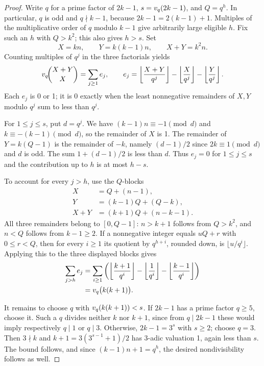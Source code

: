 \documentclass[11pt,a4paper]{article}
\begin{document}
\begin{proof}
Write $q$ for a prime factor of $2k-1$, $s=v_q(2k-1)$, and
$Q=q^h$. In particular, $q$ is odd and $q\nmid k-1$, because
$2k-1=2(k-1)+1$. Multiples of the multiplicative order of $q$ modulo
$k-1$ give arbitrarily large eligible $h$. Fix such an $h$ with
$Q>k^2$; this also gives $h>s$. Set
\[
X=kn,\qquad Y=k(k-1)n,\qquad X+Y=k^2n.
\]
Counting multiples of $q^j$ in the three factorials yields
\[
v_q\!\binom{X+Y}{X}=\sum_{j\ge 1} e_j,
\qquad
e_j=\left\lfloor\frac{X+Y}{q^j}\right\rfloor
   -\left\lfloor\frac{X}{q^j}\right\rfloor
   -\left\lfloor\frac{Y}{q^j}\right\rfloor.
\]
Each $e_j$ is 0 or 1; it is 0 exactly when the least nonnegative
remainders of $X,Y$ modulo $q^j$ sum to less than $q^j$.

For $1\le j\le s$, put $d=q^j$. We have $(k-1)n\equiv-1\pmod d$
and $k\equiv-(k-1)\pmod d$, so the remainder of $X$ is 1.
The remainder of $Y=k(Q-1)$ is the remainder of $-k$, namely
$(d-1)/2$ since $2k\equiv1\pmod d$ and $d$ is odd. The sum
$1+(d-1)/2$ is less than $d$. Thus $e_j=0$ for $1\le j\le s$ and
the contribution up to $h$ is at most $h-s$.

To account for every $j>h$, use the $Q$-blocks
\begin{align*}
X  &=Q+(n-1),\\
Y  &=(k-1)Q+(Q-k),\\
X+Y&=(k+1)Q+(n-k-1).
\end{align*}
All three remainders belong to $[0,Q-1]$: $n>k+1$ follows from
$Q>k^2$, and $n<Q$ follows from $k-1\ge2$.
If a nonnegative integer equals $uQ+r$ with $0\le r<Q$, then for
every $i\ge1$ its quotient by $q^{h+i}$, rounded down, is
$\lfloor u/q^i\rfloor$. Applying this to the three displayed
blocks gives
\begin{align*}
\sum_{j>h}e_j
 &= \sum_{i\ge1}
 \left(\left\lfloor\frac{k+1}{q^i}\right\rfloor
 -\left\lfloor\frac{1}{q^i}\right\rfloor
 -\left\lfloor\frac{k-1}{q^i}\right\rfloor\right)\\
 &= v_q\bigl(k(k+1)\bigr).
\end{align*}

It remains to choose $q$ with $v_q(k(k+1))<s$. If $2k-1$ has a
prime factor $q\ge5$, choose it. Such a $q$ divides neither $k$
nor $k+1$, since from $q\mid 2k-1$ these would imply respectively
$q\mid1$ or $q\mid3$. Otherwise, $2k-1=3^s$ with $s\ge2$; choose
$q=3$. Then $3\nmid k$ and $k+1=3(3^{s-1}+1)/2$ has $3$-adic
valuation 1, again less than $s$. The bound follows, and since
$(k-1)n+1=q^h$, the desired nondivisibility follows as well.
\end{proof}
\end{document}
